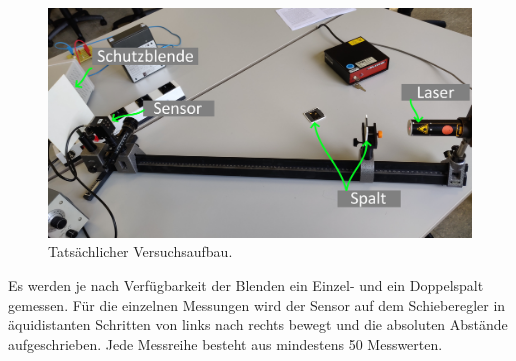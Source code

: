 \begin{figure}
    \centering
    \includegraphics[width=\textwidth]{plots/tatVersuchsaufbau.jpg}
    \caption{Tatsächlicher Versuchsaufbau.}
    \label{fig:tatVersuchsaufbau}
\end{figure}

Es werden je nach Verfügbarkeit der Blenden ein Einzel- und ein Doppelspalt gemessen.
Für die einzelnen Messungen wird der Sensor auf dem Schieberegler in äquidistanten Schritten von links nach rechts bewegt und die absoluten Abstände aufgeschrieben.
Jede Messreihe besteht aus mindestens 50 Messwerten.